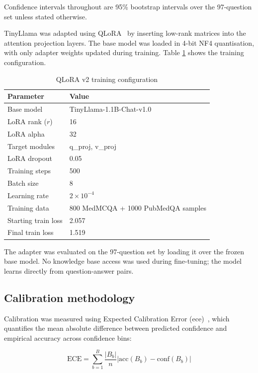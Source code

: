 Confidence intervals throughout are 95\% bootstrap intervals over the 97-question set unless stated otherwise.

TinyLlama was adapted using QLoRA~\cite{dettmers2023qlora} by inserting low-rank matrices into the attention projection layers. The base model was loaded in 4-bit NF4 quantisation, with only adapter weights updated during training. Table \ref{tab:qlora_config} shows the training configuration.

\begin{table}[htbp]
\centering
\caption{QLoRA v2 training configuration}
\label{tab:qlora_config}
\renewcommand{\arraystretch}{1.3}
\begin{tabular}{|l|l|}
\hline
\textbf{Parameter} & \textbf{Value} \\
\hline
Base model & TinyLlama-1.1B-Chat-v1.0 \\
LoRA rank ($r$) & 16 \\
LoRA alpha & 32 \\
Target modules & q\_proj, v\_proj \\
LoRA dropout & 0.05 \\
Training steps & 500 \\
Batch size & 8 \\
Learning rate & $2 \times 10^{-4}$ \\
Training data & 800 MedMCQA + 1000 PubMedQA samples \\
Starting train loss & 2.057 \\
Final train loss & 1.519 \\
\hline
\end{tabular}
\end{table}

The adapter was evaluated on the 97-question set by loading it over the frozen base model. No knowledge base access was used during fine-tuning; the model learns directly from question-answer pairs.

\subsection{Calibration methodology}

Calibration was measured using Expected Calibration Error (\ac{ece})~\cite{naeini2015obtaining}, which quantifies the mean absolute difference between predicted confidence and empirical accuracy across confidence bins:

\begin{equation}
    \text{ECE} = \sum_{b=1}^{B} \frac{|B_b|}{n} \left|\text{acc}(B_b) - \text{conf}(B_b)\right|
\end{equation}

